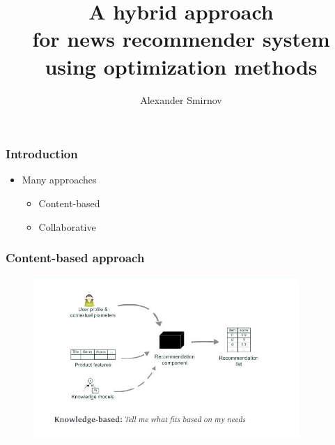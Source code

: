 \documentclass[xetex,mathserif,serif]{beamer}
\title[Recommender system]{A hybrid approach \\ for news recommender system \\ using optimization methods}
\author[Alexander Smirnov]{Alexander Smirnov}
\begin{document}
\frame{\titlepage}



\begin{frame}
	\frametitle{Introduction}

	\begin{itemize}
		\item Many approaches
		      \begin{itemize}
			      \item Content-based
			      \item Collaborative
		      \end{itemize}
	\end{itemize}

\end{frame}


\begin{frame}
	\frametitle{Content-based approach}

	\begin{figure}[h]
		\includegraphics[width=0.9\textwidth]{./images/content_based.jpeg}
		\centering
	\end{figure}
\end{frame}
\end{document}
